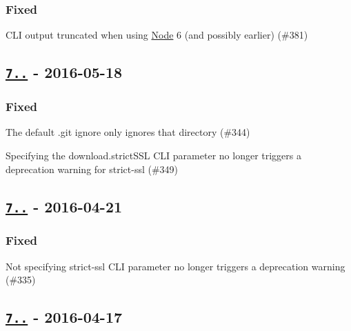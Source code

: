 \subsubsection*{Fixed}


\begin{DoxyItemize}
\item C\+LI output truncated when using \mbox{\hyperlink{classNode}{Node}} 6 (and possibly earlier) (\#381)
\end{DoxyItemize}

\subsection*{\href{https://github.com/electron-userland/electron-packager/compare/v7.0.1...v7.0.2}{\tt 7..} -\/ 2016-\/05-\/18}

\subsubsection*{Fixed}


\begin{DoxyItemize}
\item The default {\ttfamily .git} ignore only ignores that directory (\#344)
\item Specifying the {\ttfamily download.\+strict\+S\+SL} C\+LI parameter no longer triggers a deprecation warning for {\ttfamily strict-\/ssl} (\#349)
\end{DoxyItemize}

\subsection*{\href{https://github.com/electron-userland/electron-packager/compare/v7.0.0...v7.0.1}{\tt 7..} -\/ 2016-\/04-\/21}

\subsubsection*{Fixed}


\begin{DoxyItemize}
\item Not specifying {\ttfamily strict-\/ssl} C\+LI parameter no longer triggers a deprecation warning (\#335)
\end{DoxyItemize}

\subsection*{\href{https://github.com/electron-userland/electron-packager/compare/v6.0.2...v7.0.0}{\tt 7..} -\/ 2016-\/04-\/17}

